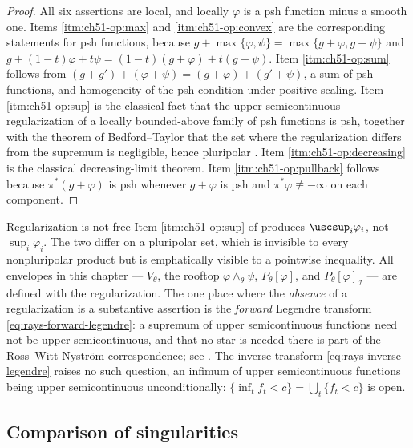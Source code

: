 \begin{proof}
All six assertions are local, and locally \(\varphi\) is a psh function
minus a smooth one.  Items \cref{itm:ch51-op:max} and
\cref{itm:ch51-op:convex} are the corresponding statements for psh
functions, because \(g+\max\{\varphi,\psi\}=\max\{g+\varphi,g+\psi\}\) and
\(g+(1-t)\varphi+t\psi=(1-t)(g+\varphi)+t(g+\psi)\).
Item \cref{itm:ch51-op:sum} follows from
\((g+g')+(\varphi+\psi)=(g+\varphi)+(g'+\psi)\), a sum of psh functions,
and homogeneity of the psh condition under positive scaling.
Item \cref{itm:ch51-op:sup} is the classical fact that the upper
semicontinuous regularization of a locally bounded-above family of psh
functions is psh, together with the theorem of Bedford--Taylor that the
set where the regularization differs from the supremum is negligible,
hence pluripolar \cite[Theorem~7.1]{BT82}.
Item \cref{itm:ch51-op:decreasing} is the classical decreasing-limit
theorem.  Item \cref{itm:ch51-op:pullback} follows because
\(\pi^*(g+\varphi)\) is psh whenever \(g+\varphi\) is psh and
\(\pi^*\varphi\not\equiv-\infty\) on each component.
\end{proof}

\begin{warning}{Regularization is not free}
\label{warn:ch51-usc}
Item \cref{itm:ch51-op:sup} of  produces \(\uscsup_i\varphi_i\), not
\(\sup_i\varphi_i\).  The two differ on a pluripolar set, which is
invisible to every nonpluripolar product but is emphatically visible to a
pointwise inequality.  All envelopes in this chapter --- \(V_\theta\), the
rooftop \(\varphi\wedge_\theta\psi\), \(P_\theta[\varphi]\), and
\(P_\theta[\varphi]_{\mathcal I}\) --- are defined with the
regularization.  The one place where the \emph{absence} of a
regularization is a substantive assertion is the \emph{forward} Legendre
transform \eqref{eq:rays-forward-legendre}: a supremum of upper
semicontinuous functions need not be upper semicontinuous, and that no star
is needed there is part of the Ross--Witt Nystr\"om correspondence; see
.  The inverse transform
\eqref{eq:rays-inverse-legendre} raises no such question, an infimum of
upper semicontinuous functions being upper semicontinuous unconditionally:
\(\{\inf_tf_t<c\}=\bigcup_t\{f_t<c\}\) is open.
\end{warning}

\subsection{Comparison of singularities}
\label{sec:ch51-ordinary-order}

